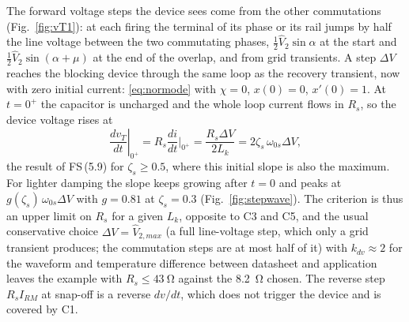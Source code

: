 \documentclass[10pt,a4paper]{scrartcl}
\newcommand{\Lk}{L_{k}}
\newcommand{\fs}[1]{\textsf{FS}\,(#1)}
\begin{document}
The forward voltage steps the device sees come from the other commutations (Fig.~\ref{fig:vT1}): at each firing the terminal of its phase or its rail jumps by half the line voltage between the two commutating phases, $\tfrac12\hat V_2\sin\alpha$ at the start and $\tfrac12\hat V_2\sin(\alpha+\mu)$ at the end of the overlap, and from grid transients. A step $\Delta V$ reaches the blocking device through the same loop as the recovery transient, now with zero initial current: \eqref{eq:normode} with $\chi = 0$, $x(0) = 0$, $x'(0) = 1$. At $t = 0^+$ the capacitor is uncharged and the whole loop current flows in $R_s$, so the device voltage rises at
\begin{equation}
\left.\frac{dv_T}{dt}\right|_{0^+} = R_s\frac{di}{dt}\Big|_{0^+} = \frac{R_s\Delta V}{2\Lk} = 2\zeta_s\,\omega_{0s}\Delta V ,
\label{eq:dvdtderiv}
\end{equation}
the result of \fs{5.9} for $\zeta_s\ge0.5$, where this initial slope is also the maximum. For lighter damping the slope keeps growing after $t = 0$ and peaks at $g(\zeta_s)\,\omega_{0s}\Delta V$ with $g = 0.81$ at $\zeta_s = 0.3$ (Fig.~\ref{fig:stepwave}). The criterion is thus an upper limit on $R_s$ for a given $\Lk$, opposite to C3 and C5, and the usual conservative choice $\Delta V = \hat V_{2,max}$ (a full line-voltage step, which only a grid transient produces; the commutation steps are at most half of it) with $k_{dv}\approx2$ for the waveform and temperature difference between datasheet and application leaves the example with $R_s\le\SI{43}{\ohm}$ against the \SI{8.2}{\ohm} chosen. The reverse step $R_sI_{RM}$ at snap-off is a reverse $dv/dt$, which does not trigger the device and is covered by C1.
\end{document}
